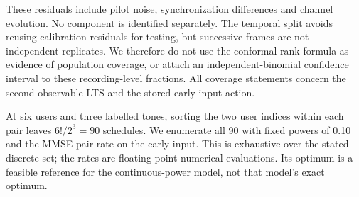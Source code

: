 \documentclass[10pt,letterpaper]{article}
\begin{document}
These residuals include pilot noise, synchronization differences and channel evolution. No component is identified separately. The temporal split avoids reusing calibration residuals for testing, but successive frames are not independent replicates. We therefore do not use the conformal rank formula as evidence of population coverage, or attach an independent-binomial confidence interval to these recording-level fractions. All coverage statements concern the second observable LTS and the stored early-input action.

At six users and three labelled tones, sorting the two user indices within each pair leaves $6!/2^3=90$ schedules. We enumerate all 90 with fixed powers of 0.10 and the MMSE pair rate on the early input. This is exhaustive over the stated discrete set; the rates are floating-point numerical evaluations. Its optimum is a feasible reference for the continuous-power model, not that model's exact optimum.
\end{document}
